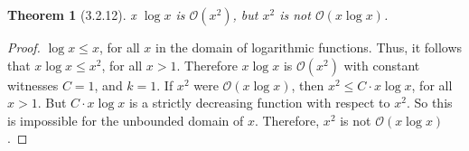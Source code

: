 \documentclass[a4paper, 12pt]{article}
\theoremstyle{plain}
\newtheorem*{theorem*}{Theorem}
\begin{document}
	
	\begin{theorem*}[3.2.12]
		x $\log x$ is $\mathcal{O}(x^{2})$, but $x^{2}$ is not $\mathcal{O}(x \log x)$.
	\end{theorem*}
	
	\begin{proof}
		$\log x \le x$, for all $x$ in the domain of logarithmic functions. Thus, it follows that $x \log x \le x^{2}$, for all $x > 1$. Therefore $x \log x$ is $\mathcal{O}(x^{2})$ with constant witnesses $C = 1$, and $k = 1$. \newline \indent If $x^{2}$ were $\mathcal{O}(x \log x)$, then $x^{2} \le C \cdot x \log x$, for all $x > 1$. But $C \cdot x \log x$ is a strictly decreasing function with respect to $x^{2}$. So this is impossible for the unbounded domain of $x$. Therefore, $x^{2}$ is not $\mathcal{O}(x \log x)$.
	\end{proof}
\end{document}
